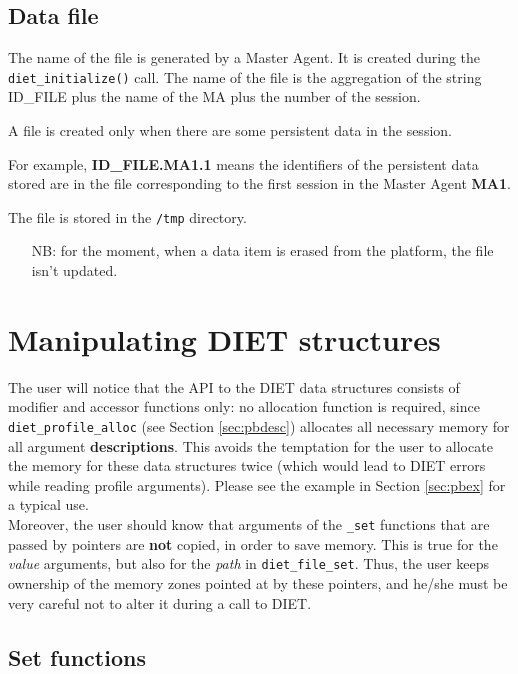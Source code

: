 \subsection{Data file}
\label{ssec:datafile}

The name of the file is generated by a Master Agent. It is created
during the \texttt{diet\_initialize()} call. The name of the file is
the aggregation of the string ID\_FILE plus the name of the MA plus
the number of the session.  

A file is created only when there are some persistent data in the
session.  

For example, \textbf{ID\_FILE.MA1.1} means the identifiers
of the persistent data stored are in the file corresponding to the
first session in the Master Agent \textbf{MA1}.

The file is stored in the \texttt{/tmp} directory.

\begin{itemize}
\item[NB:] for the moment, when a data item is erased from the platform, the
file isn't updated.
\end{itemize}


\section{Manipulating DIET structures}
\label{sec:manip}

The user will notice that the API to the DIET data structures consists of
modifier and accessor functions only: no allocation function is required, since
\texttt{diet\_profile\_alloc} (see Section \ref{sec:pbdesc}) allocates all
necessary memory for all argument \textbf{descriptions}. This avoids the
temptation for the user to allocate the memory for these data structures twice
(which would lead to DIET errors while reading profile arguments). Please see
the example in Section \ref{sec:pbex} for a typical use.
\\

Moreover, the user should know that arguments of the \texttt{\_set} functions
that are passed by pointers are \textbf{not} copied, in order to save memory.
This is true for the \emph{value} arguments, but also for the \emph{path} in
\texttt{diet\_file\_set}. Thus, the user keeps ownership of the memory zones
pointed at by these pointers, and he/she must be very careful not to alter it
during a call to DIET.

\subsection{Set functions}

